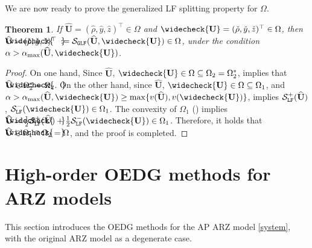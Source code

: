 \documentclass[times,final]{elsarticle}
\newtheorem{theorem}{Theorem}[section]
\numberwithin{equation}{section}
\theoremstyle{definition}
\theoremstyle{remark}
\newcommand{\BU}{\mathbf{U}}
\newcommand{\hBU}{\widehat{\BU}}
\newcommand{\cBU}{\widecheck{\BU}}
\newcommand{\hcBU}{
	\mathrlap{
		\raisebox{0.6 pt}{$\widecheck{\phantom{\mathbf{U}}}$}
	}
	\mathrlap{
		\raisebox{-0.6 pt}{$\widehat{\phantom{\mathbf{U}}}$}
	}
	\mathbf{U}
}
\newcommand{\hcr}{
	\mathrlap{
		\raisebox{0.5 pt}{$\check{\phantom{\rho}}$}
	}
	\mathrlap{
		\raisebox{-0.5 pt}{$\hat{\phantom{\rho}}$}
	}
	\rho
}
\newcommand{\hcy}{
	\mathrlap{
		\raisebox{0.5 pt}{$\check{\phantom{y}}$}
	}
	\mathrlap{
		\raisebox{-0.5 pt}{$\hat{\phantom{y}}$}
	}
	y
}
\newcommand{\hcz}{
	\mathrlap{
		\raisebox{0.5 pt}{$\check{\phantom{z}}$}
	}
	\mathrlap{
		\raisebox{-0.5 pt}{$\hat{\phantom{z}}$}
	}
	z
}
\begin{document}
We are now ready to prove the generalized LF splitting property for $\Omega$.

\begin{theorem}\label{thm:1471}
	If 
	$\hBU=(\hat{\rho},\hat{y},\hat{z})^\top \in \Omega$ and 
	$\cBU=(\check{\rho},\check{y},\check{z})^\top \in \Omega$, then 
	$\hcBU = (\hcr,\hcy,\hcz)^\top$ $:= \mathcal{S}_{\tt GLF}(\hBU,\cBU)\in \Omega$,
	under the condition $\alpha > \alpha_{\max}(\hBU,\cBU)$.
\end{theorem}

\begin{proof}
	On one hand, Since $\hBU$, $\cBU \in \Omega \subseteq \Omega_2 = \Omega_2^*$,  implies that $\hcBU \in \Omega_2^* = \Omega_2$.
	On the other hand, since $\hBU$, $\cBU \in \Omega \subseteq \Omega_1$, and $\alpha > \alpha_{\max}(\hBU, \cBU) \ge \max\{ v(\hBU), v(\cBU) \}$,  implies $\mathcal{S}^+_{\tt LF}(\hBU)$, $\mathcal{S}^-_{\tt LF}(\cBU) \in \Omega_1$. The convexity of $\Omega_1$ () implies $\hcBU = \frac12\mathcal{S}^+_{\tt LF}(\hBU)+\frac12\mathcal{S}^-_{\tt LF}(\cBU)  \in \Omega_1$.
	Therefore, it holds that $\hcBU \in \Omega_1 \cap \Omega_2 = \Omega$, and the proof is completed.
\end{proof}

\section{High-order OEDG methods for ARZ models}\label{sec:OEDG}

This section introduces the OEDG methods for the AP ARZ model \eqref{system}, with the original ARZ model as a degenerate case.
\end{document}
